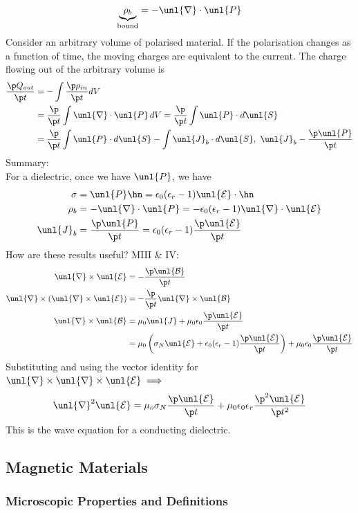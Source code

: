 \documentclass[a4paper, 11pt, normalem]{report}
\renewcommand\E{\mathcal{E}}
\newcommand\uE{\unl{\E}}
\renewcommand\B{\mathcal{B}}
\newcommand\uB{\unl{\B}}
\renewcommand\del{\unl{\nabla}}
\newcommand\eno{\epsilon_0}
\newcommand\J{\unl{J}}
\newcommand\er{\epsilon_r}
\begin{document}
\chapter{}
\begin{equation}
    \underbrace{\rho_b}_{\text{bound}} = -\del\cdot\unl{P}
\end{equation}
Consider an arbitrary volume of polarised material.
If the polarisation changes as a function of time, the moving charges are equivalent to the current.
The charge flowing out of the arbitrary volume is
\begin{align}
    \frac{\p Q_{out}}{\p t} &= -\int \frac{\p \rho_{in}}{\p t}dV \\
    &= \frac{\p}{\p t} \int \del\cdot\unl{P}\,dV = \frac{\p}{\p t}\int \unl{P}\cdot d\unl{S} \\
    &= \frac{\p}{\p t} \int \unl{P} \cdot d\unl{S} - \int \J_b \cdot d\unl{S}, ~ \J_b - \frac{\p \unl{P}}{\p t}
\end{align}
Summary: \\
For a dielectric, once we have $\unl{P}$, we have
\begin{align}
    \sigma &= \unl{P}\hn = \eno(\er - 1)\uE\cdot \hn \\
    \rho_b &= -\del\cdot\unl{P} = -\eno(\er - 1)\del\cdot\uE \\
    \J_b &= \frac{\p \unl{P}}{\p t} = \eno(\er - 1)\frac{\p\uE}{\p t}
\end{align}
How are these results useful? M\RN{3} \& \RN{4}:
\begin{align}
    \del\times\uE &= -\frac{\p\uB}{\p t} \\
    \del\times(\del\times\uE) &= -\frac{\p}{\p t}\del\times\uB \\
    \del\times\uB &= \mu_0\J + \mu_0\eno\frac{\p \uE}{\p t} \\
    &=\mu_0\left(\sigma_N\uE + \eno(\er - 1)\frac{\p\uE}{\p t}\right) + \mu_0\eno\frac{\p \uE}{\p t}
\end{align}
Substituting and using the vector identity for $\del\times\del\times\uE \implies$
\begin{equation}
    \del^2\uE = \mu_o\sigma_N \frac{\p\uE}{\p t} + \mu_0\eno\er\frac{\p^2\uE}{\p t^2}
\end{equation}
This is the wave equation for a conducting dielectric.

\section{Magnetic Materials}
\subsection{Microscopic Properties and Definitions}
\end{document}
